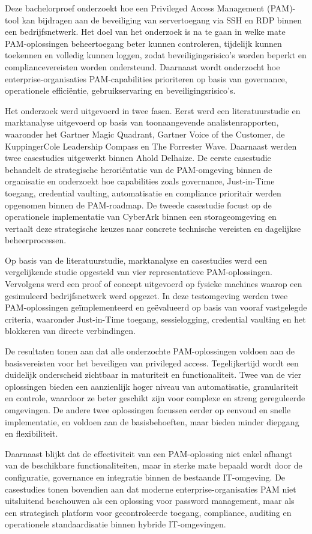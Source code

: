 Deze bachelorproef onderzoekt hoe een Privileged Access Management (PAM)-tool kan bijdragen aan de beveiliging van servertoegang via SSH en RDP binnen een bedrijfsnetwerk. Het doel van het onderzoek is na te gaan in welke mate PAM-oplossingen beheertoegang beter kunnen controleren, tijdelijk kunnen toekennen en volledig kunnen loggen, zodat beveiligingsrisico’s worden beperkt en compliancevereisten worden ondersteund. Daarnaast wordt onderzocht hoe enterprise-organisaties PAM-capabilities prioriteren op basis van governance, operationele efficiëntie, gebruikservaring en beveiligingsrisico’s.

Het onderzoek werd uitgevoerd in twee fasen. Eerst werd een literatuurstudie en marktanalyse uitgevoerd op basis van toonaangevende analistenrapporten, waaronder het Gartner Magic Quadrant, Gartner Voice of the Customer, de KuppingerCole Leadership Compass en The Forrester Wave. Daarnaast werden twee casestudies uitgewerkt binnen Ahold Delhaize. De eerste casestudie behandelt de strategische heroriëntatie van de PAM-omgeving binnen de organisatie en onderzoekt hoe capabilities zoals governance, Just-in-Time toegang, credential vaulting, automatisatie en compliance prioritair werden opgenomen binnen de PAM-roadmap. De tweede casestudie focust op de operationele implementatie van CyberArk binnen een storageomgeving en vertaalt deze strategische keuzes naar concrete technische vereisten en dagelijkse beheerprocessen.

Op basis van de literatuurstudie, marktanalyse en casestudies werd een vergelijkende studie opgesteld van vier representatieve PAM-oplossingen. Vervolgens werd een proof of concept uitgevoerd op fysieke machines waarop een gesimuleerd bedrijfsnetwerk werd opgezet. In deze testomgeving werden twee PAM-oplossingen geïmplementeerd en geëvalueerd op basis van vooraf vastgelegde criteria, waaronder Just-in-Time toegang, sessielogging, credential vaulting en het blokkeren van directe verbindingen.

De resultaten tonen aan dat alle onderzochte PAM-oplossingen voldoen aan de basisvereisten voor het beveiligen van privileged access. Tegelijkertijd wordt een duidelijk onderscheid zichtbaar in maturiteit en functionaliteit. Twee van de vier oplossingen bieden een aanzienlijk hoger niveau van automatisatie, granulariteit en controle, waardoor ze beter geschikt zijn voor complexe en streng gereguleerde omgevingen. De andere twee oplossingen focussen eerder op eenvoud en snelle implementatie, en voldoen aan de basisbehoeften, maar bieden minder diepgang en flexibiliteit.

Daarnaast blijkt dat de effectiviteit van een PAM-oplossing niet enkel afhangt van de beschikbare functionaliteiten, maar in sterke mate bepaald wordt door de configuratie, governance en integratie binnen de bestaande IT-omgeving. De casestudies tonen bovendien aan dat moderne enterprise-organisaties PAM niet uitsluitend beschouwen als een oplossing voor password management, maar als een strategisch platform voor gecontroleerde toegang, compliance, auditing en operationele standaardisatie binnen hybride IT-omgevingen.


